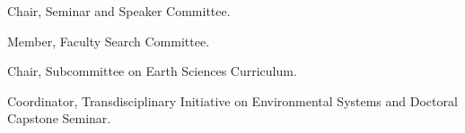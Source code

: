 \item[2017--2018] Chair, Seminar and Speaker Committee.
\item[2017--2018] Member, Faculty Search Committee.
\item[2015--2016] Chair, Subcommittee on Earth Sciences Curriculum.
\item[2006--2014] Coordinator, Transdisciplinary Initiative on Environmental Systems and Doctoral Capstone Seminar.
